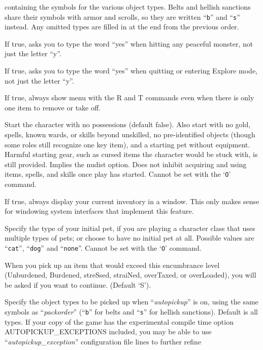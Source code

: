 containing the symbols for the various object types.  Belts and hellish
sanctions share their symbols with armor and scrolls, so they are written
``{\tt b}'' and ``{\tt s}'' instead.  Any omitted types
are filled in at the end from the previous order.
\item[\ib{paranoid\_hit}]
If true, asks you to type the word ``yes'' when hitting any peaceful
monster, not just the letter ``y''.
\item[\ib{paranoid\_quit}]
If true, asks you to type the word ``yes'' when quitting or entering
Explore mode, not just the letter ``y''.
\item[\ib{paranoid\_remove}]
If true, always show menu with the R and T commands even when there is
only one item to remove or take off.
\item[\ib{pauper}]
Start the character with no possessions (default false).  Also start
with no gold, spells, known wards, or skills beyond unskilled, no
pre-identified objects (though some roles still recognize one key item), and
a starting pet without equipment.  Harmful starting gear, such as cursed
items the character would be stuck with, is still provided.  Implies the
nudist option.  Does not inhibit acquiring and using items, spells, and
skills once play has started.  Cannot be set with the `{\tt O}' command.
\item[\ib{perm\_invent}]
If true, always display your current inventory in a window.  This only
makes sense for windowing system interfaces that implement this feature.
\item[\ib{pettype}]
Specify the type of your initial pet, if you are playing a character class
that uses multiple types of pets; or choose to have no initial pet at all.
Possible values are ``{\tt cat}'', ``{\tt dog}'' and ``{\tt none}''.
Cannot be set with the `{\tt O}' command.
\item[\ib{pickup\_burden}]
When you pick up an item that would exceed this encumbrance
level (Unburdened, Burdened, streSsed, straiNed, overTaxed,
or overLoaded), you will be asked if you want to continue.
(Default `S').
\item[\ib{pickup\_types}]
Specify the object types to be picked up when ``{\it autopickup\/}''
is on, using the same symbols as ``{\it packorder\/}'' (``{\tt b}'' for
belts and ``{\tt s}'' for hellish sanctions).  Default is all types.
If your copy of the game has the experimental compile time option
AUTOPICKUP\_EXCEPTIONS included, you may be able to use
``{\it autopickup\_exception\/}'' configuration file lines to further refine
